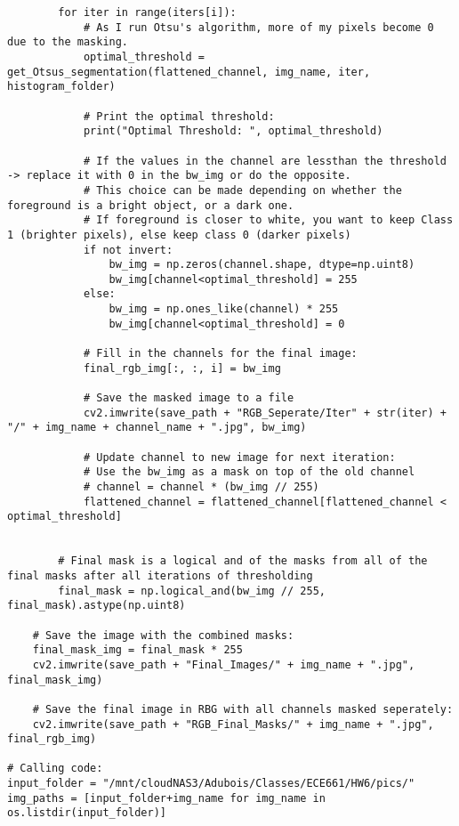 \documentclass{article}
\begin{document}
\begin{lstlisting}
        for iter in range(iters[i]):
            # As I run Otsu's algorithm, more of my pixels become 0 due to the masking.
            optimal_threshold = get_Otsus_segmentation(flattened_channel, img_name, iter, histogram_folder)
            
            # Print the optimal threshold:
            print("Optimal Threshold: ", optimal_threshold)
            
            # If the values in the channel are lessthan the threshold -> replace it with 0 in the bw_img or do the opposite.
            # This choice can be made depending on whether the foreground is a bright object, or a dark one.
            # If foreground is closer to white, you want to keep Class 1 (brighter pixels), else keep class 0 (darker pixels)
            if not invert:
                bw_img = np.zeros(channel.shape, dtype=np.uint8)
                bw_img[channel<optimal_threshold] = 255
            else:
                bw_img = np.ones_like(channel) * 255
                bw_img[channel<optimal_threshold] = 0
            
            # Fill in the channels for the final image:
            final_rgb_img[:, :, i] = bw_img
            
            # Save the masked image to a file
            cv2.imwrite(save_path + "RGB_Seperate/Iter" + str(iter) + "/" + img_name + channel_name + ".jpg", bw_img)
            
            # Update channel to new image for next iteration:
            # Use the bw_img as a mask on top of the old channel
            # channel = channel * (bw_img // 255)
            flattened_channel = flattened_channel[flattened_channel < optimal_threshold]
        
        
        # Final mask is a logical and of the masks from all of the final masks after all iterations of thresholding
        final_mask = np.logical_and(bw_img // 255, final_mask).astype(np.uint8)
            
    # Save the image with the combined masks:
    final_mask_img = final_mask * 255
    cv2.imwrite(save_path + "Final_Images/" + img_name + ".jpg", final_mask_img)
    
    # Save the final image in RBG with all channels masked seperately:
    cv2.imwrite(save_path + "RGB_Final_Masks/" + img_name + ".jpg", final_rgb_img)

# Calling code:
input_folder = "/mnt/cloudNAS3/Adubois/Classes/ECE661/HW6/pics/"
img_paths = [input_folder+img_name for img_name in os.listdir(input_folder)]


\end{lstlisting}
\end{document}
